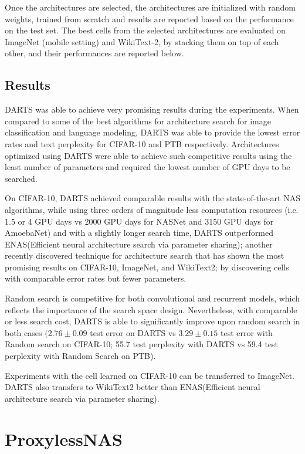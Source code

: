 \documentclass{ieee}
\begin{document}
Once the architectures are selected, the architectures are initialized with random weights, trained from scratch and results are reported based on the performance on the test set. The best cells from the selected architectures are evaluated on ImageNet (mobile setting) and WikiText-2, by stacking them on top of each other, and their performances are reported below.


\subsection{Results}
DARTS was able to achieve very promising results during the experiments. When compared to some of the best algorithms for architecture search for image classification and language modeling, DARTS was able to provide the lowest error rates and text perplexity for CIFAR-10 and PTB respectively. Architectures optimized using DARTS were able to achieve such competitive results using the least number of parameters and required the lowest number of GPU days to be searched.

On CIFAR-10, DARTS achieved comparable results with the state-of-the-art NAS algorithms, while using three orders of magnitude less computation resources (i.e. 1.5 or 4 GPU days vs 2000 GPU days for NASNet and 3150 GPU days for AmoebaNet) and with a slightly longer search time, DARTS outperformed ENAS(Efficient neural architecture search via parameter sharing); another recently discovered technique for architecture search that has shown the most promising results on CIFAR-10, ImageNet, and WikiText2; by discovering cells with comparable error rates but fewer parameters.

Random search is competitive for both convolutional and recurrent models, which reflects the importance of the search space design. Nevertheless, with comparable or less search cost, DARTS is able to significantly improve upon random search in both cases $(2.76 \pm 0.09$  test error on DARTS vs $3.29 \pm 0.15$ test error with Random search on CIFAR-10; 55.7 test perplexity with DARTS vs 59.4 test perplexity with Random Search on PTB). 

Experiments with the cell learned on CIFAR-10 can be transferred to ImageNet. DARTS also transfers to WikiText2 better than ENAS(Efficient neural architecture search via parameter sharing).

\section{ProxylessNAS}
\end{document}
